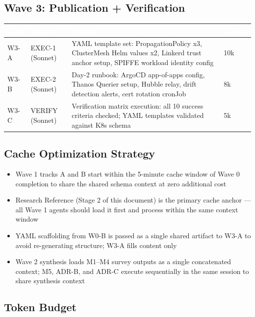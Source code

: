 \documentclass[11pt,letterpaper]{article}
\newcommand{\tableheader}[1]{\textbf{\sffamily\textcolor{white}{#1}}}
\begin{document}
\subsection{Wave 3: Publication + Verification}

\begin{center}
\begin{tabularx}{\textwidth}{L{2cm}L{3.5cm}XC{2cm}}
\toprule
{}
\tableheader{Task} & \tableheader{Agent} & \tableheader{Output} & \tableheader{Tokens} \\
\midrule
W3-A & EXEC-1 (Sonnet) & YAML template set: PropagationPolicy x3, ClusterMesh Helm values x2, Linkerd trust anchor setup, SPIFFE workload identity config & 10k \\
W3-B & EXEC-2 (Sonnet) & Day-2 runbook: ArgoCD app-of-apps config, Thanos Querier setup, Hubble relay, drift detection alerts, cert rotation cronJob & 8k \\
W3-C & VERIFY (Sonnet) & Verification matrix execution: all 10 success criteria checked; YAML templates validated against K8s schema & 5k \\
\bottomrule
\end{tabularx}
\end{center}

\subsection{Cache Optimization Strategy}

\begin{itemize}[leftmargin=1.5em]
  \item Wave 1 tracks A and B start within the 5-minute cache window of Wave 0 completion to share the shared schema context at zero additional cost
  \item Research Reference (Stage 2 of this document) is the primary cache anchor --- all Wave 1 agents should load it first and process within the same context window
  \item YAML scaffolding from W0-B is passed as a single shared artifact to W3-A to avoid re-generating structure; W3-A fills content only
  \item Wave 2 synthesis loads M1--M4 survey outputs as a single concatenated context; M5, ADR-B, and ADR-C execute sequentially in the same session to share synthesis context
\end{itemize}

\subsection{Token Budget}
\end{document}
